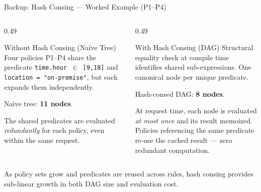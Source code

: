\documentclass[aspectratio=169,10pt]{beamer}
\newcommand{\highlightbanner}[1]{%
  \begin{center}
  \begin{tcolorbox}[colback=uhapGray,colframe=uhapGray,
                    boxrule=0pt,arc=1mm,
                    left=6pt,right=6pt,top=1pt,bottom=1pt,
                    width=0.97\linewidth,
                    borderline west={2pt}{0pt}{uhapTeal}]
  \tiny\color{uhapNavyD}#1
  \end{tcolorbox}
  \end{center}}
\begin{document}
\begin{frame}[t,noframenumbering]{Backup: Hash Consing --- Worked Example (P1--P4)}
\vspace{3pt}
\begin{columns}[T,onlytextwidth]
\begin{column}{0.49\textwidth}
\begin{callout}{Without Hash Consing (Na\"ive Tree)}
Four policies P1--P4 share the predicate
\texttt{time.hour $\in$ [9,18]} and \texttt{location = "on-premise"},
but each expands them independently.

Na\"ive tree: \textbf{11 nodes}.

The shared predicates are evaluated \emph{redundantly} for each policy, even within the same request.
\end{callout}
\end{column}
\begin{column}{0.49\textwidth}
\begin{callout}{With Hash Consing (DAG)}
Structural equality check at compile time identifies shared sub-expressions. One canonical node per unique predicate.

Hash-consed DAG: \textbf{8 nodes}.

At request time, each node is evaluated \emph{at most once} and its result memoized. Policies referencing the same predicate re-use the cached result --- zero redundant computation.
\end{callout}
\end{column}
\end{columns}
\vspace{4pt}
\highlightbanner{As policy sets grow and predicates are reused across rules, hash consing provides sub-linear growth in both DAG size and evaluation cost.}
\end{frame}
\end{document}
